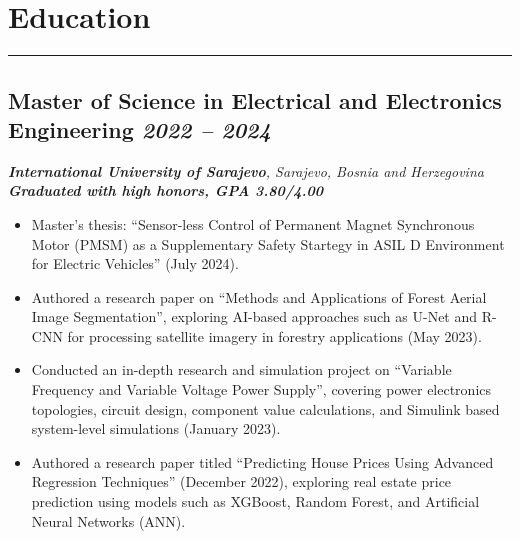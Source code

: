 \section*{Education}
\vspace{-5pt} 
\noindent\rule{\textwidth}{0.4pt} %

\subsection*{\textbf{Master of Science in Electrical and Electronics Engineering} \hfill \textit{2022 -- 2024}}  
\noindent\textit{\textbf{International University of Sarajevo}, Sarajevo, Bosnia and Herzegovina} \\
\noindent\textit{\textbf{Graduated with high honors, GPA 3.80/4.00}} 
\begin{itemize}[leftmargin=*,noitemsep,topsep=3pt]
    \item Master's thesis: \enquote{Sensor-less Control of Permanent Magnet Synchronous Motor (PMSM) as a Supplementary Safety Startegy in ASIL D Environment for Electric Vehicles} (July 2024).
    \item Authored a research paper on \enquote{Methods and Applications of Forest Aerial Image Segmentation}, exploring AI-based approaches such as U-Net and R-CNN for processing satellite imagery in forestry applications (May 2023).
    \item Conducted an in-depth research and simulation project on \enquote{Variable Frequency and Variable Voltage Power Supply}, covering power electronics topologies, circuit design, component value calculations, and Simulink based system-level simulations (January 2023).
    \item Authored a research paper titled \enquote{Predicting House Prices Using Advanced Regression Techniques} (December 2022), exploring real estate price prediction using models such as XGBoost, Random Forest, and Artificial Neural Networks (ANN).
\end{itemize}
\vspace{20pt}

